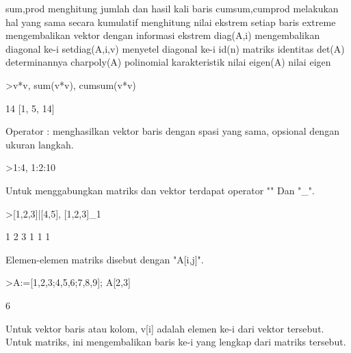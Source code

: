 \documentclass[a4paper,10pt]{article}
\begin{document}
\begin{eulernotebook}
\begin{eulercomment}
\begin{eulercomment}
\begin{eulercomment}
\begin{eulercomment}
\begin{eulercomment}
\begin{eulercomment}
\begin{eulercomment}
\begin{eulercomment}
\begin{eulercomment}
\end{eulercomment}
\begin{eulerttcomment}
  sum,prod menghitung jumlah dan hasil kali baris
  cumsum,cumprod melakukan hal yang sama secara kumulatif
  menghitung nilai ekstrem setiap baris
  extreme mengembalikan vektor dengan informasi ekstrem
  diag(A,i) mengembalikan diagonal ke-i
  setdiag(A,i,v) menyetel diagonal ke-i
  id(n) matriks identitas
  det(A) determinannya
  charpoly(A) polinomial karakteristik
  nilai eigen(A) nilai eigen
\end{eulerttcomment}
\begin{eulerprompt}
>v*v, sum(v*v), cumsum(v*v)
\end{eulerprompt}
\begin{euleroutput}
  [1,  4,  9]
  14
  [1,  5,  14]
\end{euleroutput}
\begin{eulercomment}
Operator : menghasilkan vektor baris dengan spasi yang sama, opsional
dengan ukuran langkah.
\end{eulercomment}
\begin{eulerprompt}
>1:4, 1:2:10
\end{eulerprompt}
\begin{euleroutput}
  [1,  2,  3,  4]
  [1,  3,  5,  7,  9]
\end{euleroutput}
\begin{eulercomment}
Untuk menggabungkan matriks dan vektor terdapat operator "\textbar{}" Dan "\_".
\end{eulercomment}
\begin{eulerprompt}
>[1,2,3]|[4,5], [1,2,3]_1
\end{eulerprompt}
\begin{euleroutput}
  [1,  2,  3,  4,  5]
              1             2             3 
              1             1             1 
\end{euleroutput}
\begin{eulercomment}
Elemen-elemen matriks disebut dengan "A[i,j]".
\end{eulercomment}
\begin{eulerprompt}
>A:=[1,2,3;4,5,6;7,8,9]; A[2,3]
\end{eulerprompt}
\begin{euleroutput}
  6
\end{euleroutput}
\begin{eulercomment}
Untuk vektor baris atau kolom, v[i] adalah elemen ke-i dari vektor
tersebut. Untuk matriks, ini mengembalikan baris ke-i yang lengkap
dari matriks tersebut.

\end{eulercomment}
\end{eulercomment}
\end{eulercomment}
\end{eulercomment}
\end{eulercomment}
\end{eulercomment}
\end{eulercomment}
\end{eulercomment}
\end{eulercomment}
\end{eulernotebook}
\end{document}
